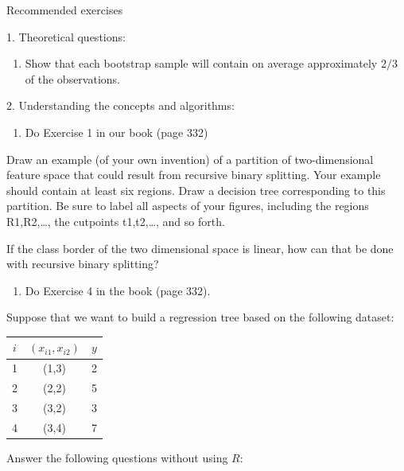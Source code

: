 \documentclass[10pt,ignorenonframetext,]{beamer}
\providecommand{\tightlist}{%
  \setlength{\itemsep}{0pt}\setlength{\parskip}{0pt}}
\begin{document}
\begin{frame}[fragile]{Recommended exercises}

\begin{block}{1. Theoretical questions:}

\begin{enumerate}
\def\labelenumi{\alph{enumi})}
\tightlist
\item
  Show that each bootstrap sample will contain on average approximately
  \(2/3\) of the observations.
\end{enumerate}

\end{block}

\begin{block}{2. Understanding the concepts and algorithms:}

\begin{enumerate}
\def\labelenumi{\alph{enumi})}
\tightlist
\item
  Do Exercise 1 in our book (page 332)
\end{enumerate}

Draw an example (of your own invention) of a partition of
two-dimensional feature space that could result from recursive binary
splitting. Your example should contain at least six regions. Draw a
decision tree corresponding to this partition. Be sure to label all
aspects of your figures, including the regions R1,R2,\ldots{}, the
cutpoints t1,t2,\ldots{}, and so forth.

If the class border of the two dimensional space is linear, how can that
be done with recursive binary splitting?

\begin{enumerate}
\def\labelenumi{\alph{enumi})}
\setcounter{enumi}{1}
\tightlist
\item
  Do Exercise 4 in the book (page 332).
\end{enumerate}

Suppose that we want to build a regression tree based on the following
dataset:

\begin{longtable}[]{@{}ccc@{}}
\toprule
\(i\) & \((x_{i1},x_{i2})\) & \(y\)\tabularnewline
\midrule
\endhead
1 & (1,3) & 2\tabularnewline
2 & (2,2) & 5\tabularnewline
3 & (3,2) & 3\tabularnewline
4 & (3,4) & 7\tabularnewline
\bottomrule
\end{longtable}

Answer the following questions without using \(R\):


\end{block}
\end{frame}
\end{document}
